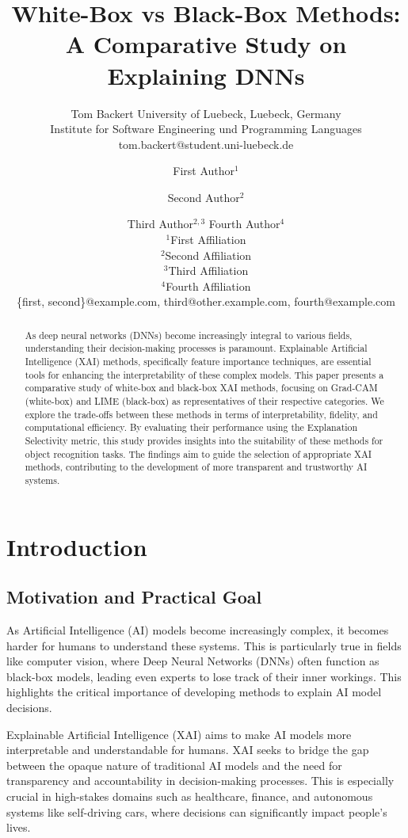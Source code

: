 \documentclass{article}
\title{White-Box vs Black-Box Methods: A Comparative Study on Explaining DNNs}
\author{
    Tom Backert
    \affiliations
    University of Luebeck, Luebeck, Germany\\
    Institute for Software Engineering und Programming Languages
    \emails
    tom.backert@student.uni-luebeck.de
}
\author{
First Author$^1$
\and
Second Author$^2$\and
Third Author$^{2,3}$\And
Fourth Author$^4$\\
\affiliations
$^1$First Affiliation\\
$^2$Second Affiliation\\
$^3$Third Affiliation\\
$^4$Fourth Affiliation\\
\emails
\{first, second\}@example.com,
third@other.example.com,
fourth@example.com
}
\begin{document}
\maketitle

\begin{abstract}
    As deep neural networks (DNNs) become increasingly integral to various fields, understanding their decision-making processes is paramount. Explainable Artificial Intelligence (XAI) methods, specifically feature importance techniques, are essential tools for enhancing the interpretability of these complex models. This paper presents a comparative study of white-box and black-box XAI methods, focusing on Grad-CAM (white-box) and LIME (black-box) as representatives of their respective categories. We explore the trade-offs between these methods in terms of interpretability, fidelity, and computational efficiency. By evaluating their performance using the Explanation Selectivity metric, this study provides insights into the suitability of these methods for object recognition tasks. The findings aim to guide the selection of appropriate XAI methods, contributing to the development of more transparent and trustworthy AI systems.
\end{abstract}

\section{Introduction}
\subsection{Motivation and Practical Goal}
As Artificial Intelligence (AI) models become increasingly complex, it becomes harder for humans to understand these systems. This is particularly true in fields like computer vision, where Deep Neural Networks (DNNs) often function as black-box models, leading even experts to lose track of their inner workings. This highlights the critical importance of developing methods to explain AI model decisions.

Explainable Artificial Intelligence (XAI) aims to make AI models more interpretable and understandable for humans. XAI seeks to bridge the gap between the opaque nature of traditional AI models and the need for transparency and accountability in decision-making processes. This is especially crucial in high-stakes domains such as healthcare, finance, and autonomous systems like self-driving cars, where decisions can significantly impact people’s lives.
\end{document}
